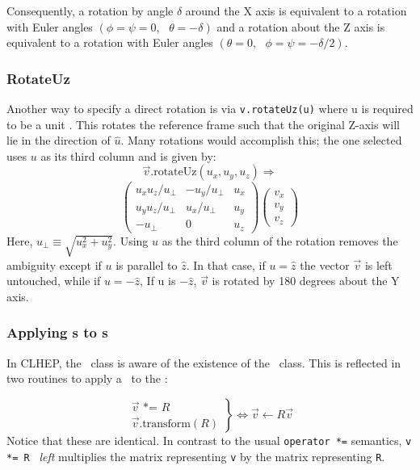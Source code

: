 Consequently, a rotation by angle $\delta$ around the X axis is
equivalent to a rotation with Euler angles
$(\phi=\psi=0, \mbox{ } \theta = - \delta)$
and a rotation about the Z axis is
equivalent to a rotation with Euler angles
$(\theta = 0, \mbox{ } \phi=\psi= - \delta/2)$.

\subsubsection{RotateUz}

Another way to specify a direct rotation is via {\tt v.rotateUz(u)}
where u is required to be a unit \SV .
This rotates the reference frame such that the original Z-axis will lie 
in the direction of $\hat{u}$.  Many rotations would accomplish this; the
one selected uses $u$ as its third column and is given by:
\[  \vec{v}.\mbox{rotateUz}(u_x, u_y, u_z)\Longrightarrow  \]
\begin{equation}
\label{eq:rotUz}
\left(
\begin{array}{ccc}
u_x u_z / u_\perp & - u_y / u_\perp & u_x \\
u_y u_z / u_\perp &   u_x / u_\perp & u_y \\
- u_\perp         &      0          & u_z
\end{array}
\right)
\left(
\begin{array}{c}
v_x\\
v_y\\
v_z
\end{array}
\right)
\end{equation}
\noindent
Here, $u_\perp \equiv \sqrt{u_x^2 + u_y^2}$.  Using $u$ as the third column of 
the rotation removes the ambiguity except if $u$ is parallel to $\hat{z}$.
In that case, if $u = \hat{z}$ the vector $\vec{v}$ is left untouched, 
while if 
$u = - \hat{z}$,
If u is $-\hat{z}$, $\vec{v}$ is rotated by 180 degrees about the Y axis.

\subsubsection{Applying \protect\Ro s to \protect\SV s}

In CLHEP, the \SV\ class is aware of the existence of the \Ro\ class.  
This is reflected in two routines to apply a \Ro\ to the \SV :

\begin{equation}
\label{eq:opstareq}
\left.
\begin{array} {r}
\vec{v} \mbox{ *= } R \\
\vec{v} \mbox{.transform} (R) 
\end{array}
\right\}
\Longleftrightarrow
\vec{v} \leftarrow R \vec{v}
\end{equation}
\noindent
Notice that these are identical.
In contrast to the usual {\tt operator *=} semantics, 
{\tt v *= R } {\it left} multiplies the matrix representing {\tt v} 
by the matrix representing {\tt R}.


